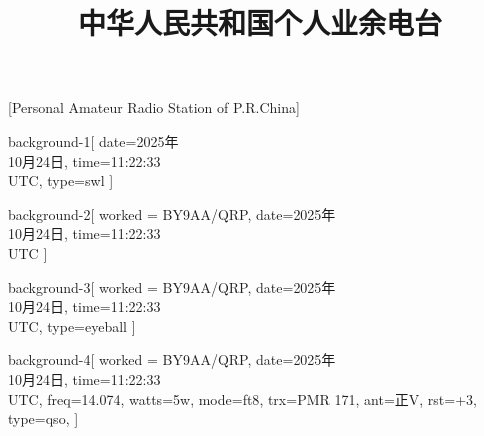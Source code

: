 \documentclass{qsl}
\begin{document}


    \title{中华人民共和国个人业余电台}[Personal Amateur Radio Station of P.R.China]

    \begin{card}{background-1}[
        date={2025年\\10月24日},
        time={11:22:33\\UTC},
        type=swl
    ]
        \bidicontourlength{2pt}  \kaishu \huge \bfseries
        \vfill
    \end{card}

    \begin{card}{background-2}[
        worked = BY9AA/QRP,
        date={2025年\\10月24日},
        time={11:22:33\\UTC}
    ]
        \bidicontourlength{2pt}  \kaishu \huge \bfseries
        \vfill
    \end{card}

    \begin{card}[angle=90]{background-3}[
        worked = BY9AA/QRP,
        date={2025年\\10月24日},
        time={11:22:33\\UTC},
        type=eyeball
    ]
            \bidicontourlength{2pt}  \kaishu \huge \bfseries
             \vfill \hfill
    \end{card}


    \begin{card}[angle=90]{background-4}[
        worked = BY9AA/QRP,
        date={2025年\\10月24日},
        time={11:22:33\\UTC},
        freq={14.074},
        watts={5w},
        mode={ft8},
        trx={PMR 171},
        ant={正V},
        rst={+3},
        type=qso,
    ]
        \bidicontourlength{2pt}  \kaishu \huge \bfseries
         \vfill \hfill
    \end{card}
\end{document}
